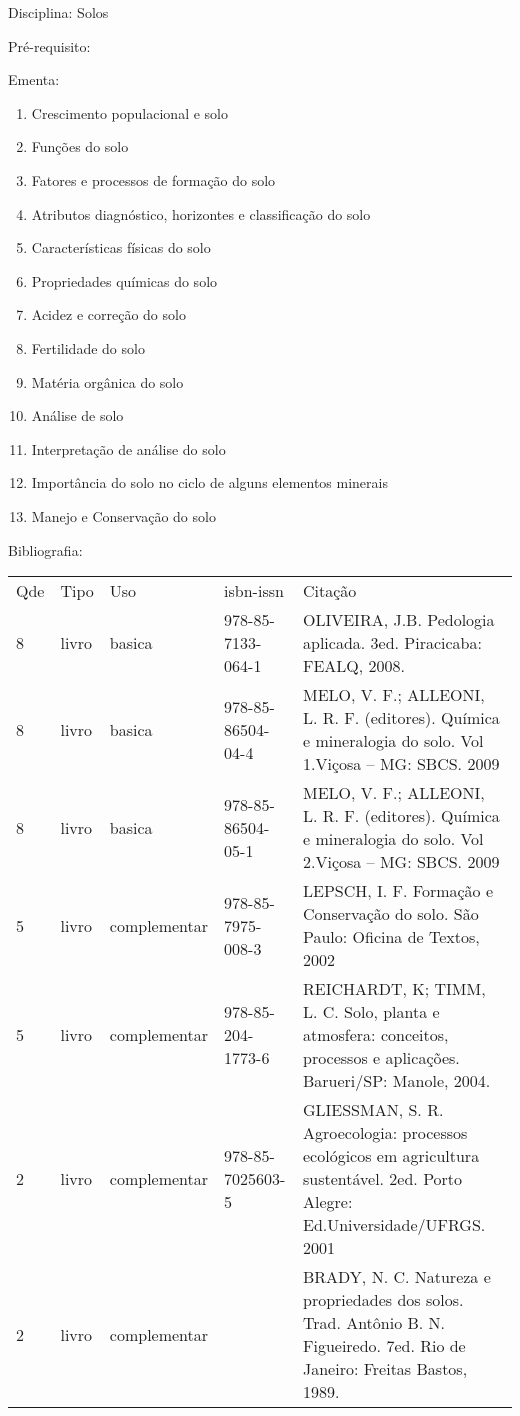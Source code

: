 \documentclass[12pt,a4paper,twoside]{report}
\begin{document}
Disciplina: Solos

Pré-requisito:
\begin{enumerate}
\end{enumerate}

Ementa:
\begin{enumerate}
\item Crescimento populacional e solo
\item Funções do solo
\item Fatores e processos de formação do solo
\item Atributos diagnóstico, horizontes e classificação do solo
\item Características físicas do solo
\item Propriedades químicas do solo
\item Acidez e correção do solo
\item Fertilidade do solo
\item Matéria orgânica do solo
\item Análise de solo
\item Interpretação de análise do solo
\item Importância do solo no ciclo de alguns elementos minerais
\item Manejo e Conservação do solo
\end{enumerate}

Bibliografia:
\begin{tabular}{lllll}
Qde & Tipo & Uso & isbn-issn & Citação \\
8&livro&basica&978-85-7133-064-1&OLIVEIRA, J.B. Pedologia aplicada.  3ed. Piracicaba: FEALQ, 2008.\\
8&livro&basica&978-85-86504-04-4&MELO, V. F.; ALLEONI, L. R. F. (editores). Química e mineralogia do solo. Vol 1.Viçosa – MG: SBCS. 2009\\
8&livro&basica&978-85-86504-05-1&MELO, V. F.; ALLEONI, L. R. F. (editores). Química e mineralogia do solo. Vol 2.Viçosa – MG: SBCS. 2009\\
5&livro&complementar&978-85-7975-008-3&LEPSCH, I. F. Formação e Conservação do solo. São Paulo: Oficina de Textos, 2002\\
5&livro&complementar&978-85-204-1773-6&REICHARDT, K; TIMM, L. C. Solo, planta e atmosfera: conceitos, processos e aplicações. Barueri/SP: Manole, 2004.\\
2&livro&complementar&978-85-7025603-5&GLIESSMAN, S. R. Agroecologia: processos ecológicos em agricultura sustentável. 2ed. Porto Alegre: Ed.Universidade/UFRGS. 2001\\
2&livro&complementar&&BRADY, N. C. Natureza e propriedades dos solos. Trad. Antônio B. N. Figueiredo. 7ed. Rio de Janeiro: Freitas Bastos, 1989.\\
\end{tabular}
\end{document}
